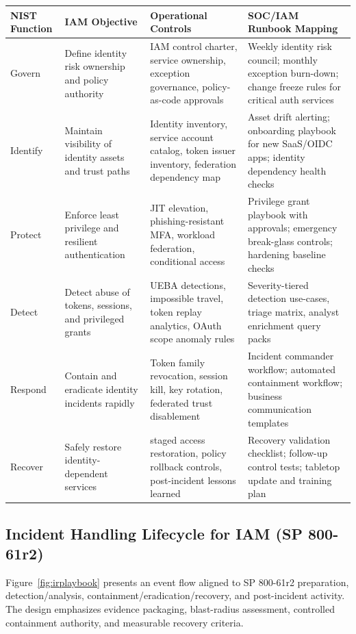 \documentclass[11pt]{article}
\begin{document}
\begin{longtable}{>{\raggedright\arraybackslash}p{} >{\raggedright\arraybackslash}p{} >{\raggedright\arraybackslash}p{} >{\raggedright\arraybackslash}p{}}
\toprule
\textbf{NIST Function} & \textbf{IAM Objective} & \textbf{Operational Controls} & \textbf{SOC/IAM Runbook Mapping} \\
\midrule
\endhead
Govern & Define identity risk ownership and policy authority & IAM control charter, service ownership, exception governance, policy-as-code approvals & Weekly identity risk council; monthly exception burn-down; change freeze rules for critical auth services \\
Identify & Maintain visibility of identity assets and trust paths & Identity inventory, service account catalog, token issuer inventory, federation dependency map & Asset drift alerting; onboarding playbook for new SaaS/OIDC apps; identity dependency health checks \\
Protect & Enforce least privilege and resilient authentication & JIT elevation, phishing-resistant MFA, workload federation, conditional access & Privilege grant playbook with approvals; emergency break-glass controls; hardening baseline checks \\
Detect & Detect abuse of tokens, sessions, and privileged grants & UEBA detections, impossible travel, token replay analytics, OAuth scope anomaly rules & Severity-tiered detection use-cases, triage matrix, analyst enrichment query packs \\
Respond & Contain and eradicate identity incidents rapidly & Token family revocation, session kill, key rotation, federated trust disablement & Incident commander workflow; automated containment workflow; business communication templates \\
Recover & Safely restore identity-dependent services & staged access restoration, policy rollback controls, post-incident lessons learned & Recovery validation checklist; follow-up control tests; tabletop update and training plan \\
\bottomrule
\end{longtable}

\subsection{Incident Handling Lifecycle for IAM (SP 800-61r2)}
Figure~\ref{fig:irplaybook} presents an event flow aligned to SP 800-61r2 preparation, detection/analysis, containment/eradication/recovery, and post-incident activity. The design emphasizes evidence packaging, blast-radius assessment, controlled containment authority, and measurable recovery criteria.
\end{document}
